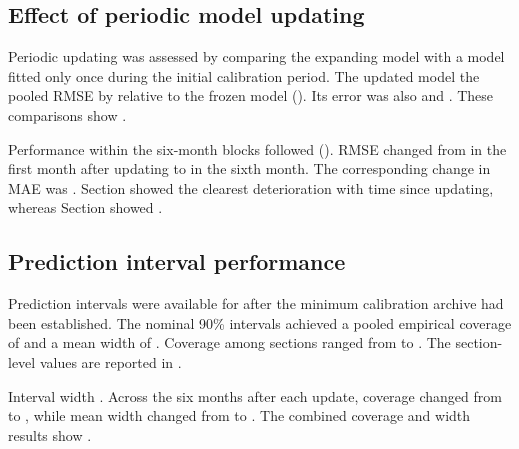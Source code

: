 \subsection{Effect of periodic model updating}
\label{subsec:results_updates}

Periodic updating was assessed by comparing the expanding model with a model fitted only once during the initial calibration period. The updated model  the pooled RMSE by  relative to the frozen model (). Its error was also  and . These comparisons show .

Performance within the six-month blocks followed  (). RMSE changed from  in the first month after updating to  in the sixth month. The corresponding change in MAE was . Section  showed the clearest deterioration with time since updating, whereas Section  showed .

\subsection{Prediction interval performance}
\label{subsec:results_intervals}

Prediction intervals were available for  after the minimum calibration archive had been established. The nominal 90\% intervals achieved a pooled empirical coverage of  and a mean width of . Coverage among sections ranged from  to . The section-level values are reported in .

Interval width . Across the six months after each update, coverage changed from  to , while mean width changed from  to . The combined coverage and width results show .

